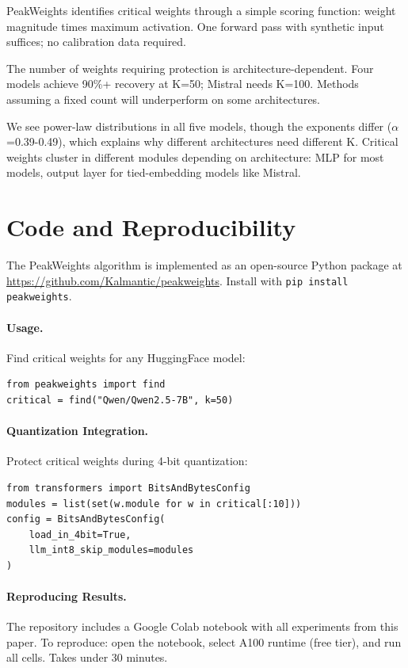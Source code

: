 \documentclass{article}
\begin{document}
PeakWeights identifies critical weights through a simple scoring function: weight magnitude times maximum activation. One forward pass with synthetic input suffices; no calibration data required.

The number of weights requiring protection is architecture-dependent. Four models achieve 90\%+ recovery at K=50; Mistral needs K=100. Methods assuming a fixed count will underperform on some architectures.

We see power-law distributions in all five models, though the exponents differ ($\alpha$=0.39-0.49), which explains why different architectures need different K. Critical weights cluster in different modules depending on architecture: MLP for most models, output layer for tied-embedding models like Mistral.

\section*{Code and Reproducibility}

The PeakWeights algorithm is implemented as an open-source Python package at \url{https://github.com/Kalmantic/peakweights}. Install with \texttt{pip install peakweights}.

\paragraph{Usage.} Find critical weights for any HuggingFace model:

\begin{lstlisting}
from peakweights import find
critical = find("Qwen/Qwen2.5-7B", k=50)
\end{lstlisting}

\paragraph{Quantization Integration.} Protect critical weights during 4-bit quantization:

\begin{lstlisting}
from transformers import BitsAndBytesConfig
modules = list(set(w.module for w in critical[:10]))
config = BitsAndBytesConfig(
    load_in_4bit=True,
    llm_int8_skip_modules=modules
)
\end{lstlisting}

\paragraph{Reproducing Results.} The repository includes a Google Colab notebook with all experiments from this paper. To reproduce: open the notebook, select A100 runtime (free tier), and run all cells. Takes under 30 minutes.
\end{document}
